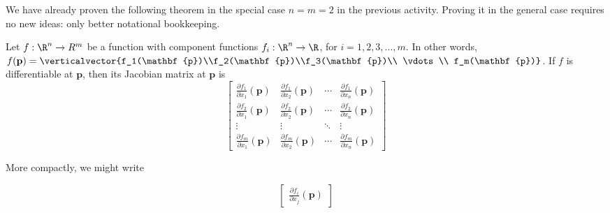 \documentclass{ximera}
\begin{document}
	We have already proven the following theorem in the special case $n=m=2$ in the previous activity.  Proving it in the general case requires no new ideas: 
	 only better notational bookkeeping.
	
	\begin{theorem}
		Let $f:\R^n \to R^m$ be a function with component functions $f_i:\R^n \to \R$, for $i=1,2,3,...,m$.  In other words,
		$f(\mathbf{p}) = \verticalvector{f_1(\mathbf{p})\\f_2(\mathbf{p})\\f_3(\mathbf{p})\\ \vdots \\ f_m(\mathbf{p})}$.  If $f$ is differentiable at $\mathbf{p}$,
		 then its Jacobian matrix at $\mathbf{p}$ is 
                 \[
                 \begin{bmatrix}
                   \frac{\partial f_1}{\partial x_1} \left(\mathbf{p}\right) & \frac{\partial f_1}{\partial x_2} \left(\mathbf{p}\right) & \cdots & \frac{\partial f_1}{\partial x_n}\left(\mathbf{p}\right) \\
                   \frac{\partial f_2}{\partial x_1} \left(\mathbf{p}\right) & \frac{\partial f_2}{\partial x_2} \left(\mathbf{p}\right) & \cdots & \frac{\partial f_2}{\partial x_n}\left(\mathbf{p}\right) \\
                   \vdots                                                    & \vdots                                                    & \ddots & \vdots \\
                   \frac{\partial f_m}{\partial x_1} \left(\mathbf{p}\right) & \frac{\partial f_m}{\partial x_2} \left(\mathbf{p}\right) & \cdots & \frac{\partial f_m}{\partial x_n}\left(\mathbf{p}\right) 
                 \end{bmatrix}
                 \]
		  
		  More compactly, we might write
		  
		  \[
		  	\begin{bmatrix}\frac{\partial f_i}{\partial x_j} \left( \mathbf{p} \right)		\end{bmatrix}
		  	  \]
		  

	\end{theorem}
	
\end{document}
